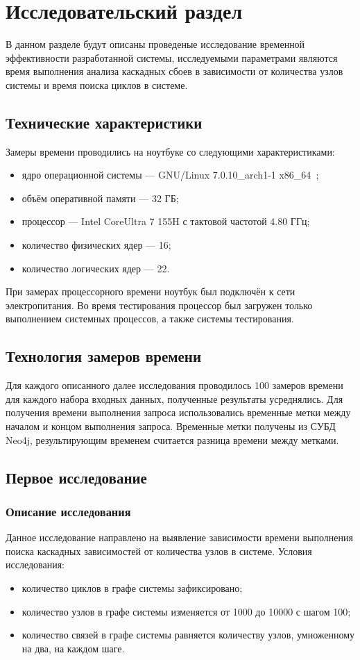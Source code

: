 \section{Исследовательский раздел}
В данном разделе будут описаны проведеные исследование временной эффективности
разработанной системы, исследуемыми параметрами являются время выполнения
анализа каскадных сбоев в зависимости от количества узлов системы и время
поиска циклов в системе.

\subsection{Технические характеристики}
Замеры времени проводились на ноутбуке со следующими характеристиками:
\begin{itemize}
    \item ядро операционной системы --- GNU/Linux 7.0.10\_arch1-1 x86\_64~\cite{ref:archbtw};
    \item объём оперативной памяти --- 32 ГБ;
    \item процессор --- Intel\textregistered \enspace 
    Core\texttrademark \enspace Ultra 7 155H с тактовой частотой 4.80 ГГц;
    \item количество физических ядер --- 16;
    \item количество логических ядер --- 22.
\end{itemize}

При замерах процессорного времени ноутбук был подключён к сети электропитания.
Во время тестирования процессор был загружен только выполнением системных
процессов, а также системы тестирования.

\subsection{Технология замеров времени}
Для каждого описанного далее исследования проводилось 100 замеров времени для
каждого набора входных данных, полученные результаты усреднялись. Для получения
времени выполнения запроса использовались временные метки между началом и концом
выполнения запроса. Временные метки получены из СУБД Neo4j, результирующим временем
считается разница времени между метками.

\subsection{Первое исследование}
\subsubsection{Описание исследования}
Данное исследование направлено на выявление зависимости времени выполнения поиска
каскадных зависимостей от количества узлов в системе. Условия исследования:
\begin{itemize}
    \item количество циклов в графе системы зафиксировано;
    \item количество узлов в графе системы изменяется от 1000 до 10000 с шагом 100;
    \item количество связей в графе системы равняется количеству узлов, умноженному на два, на каждом шаге.
\end{itemize}

